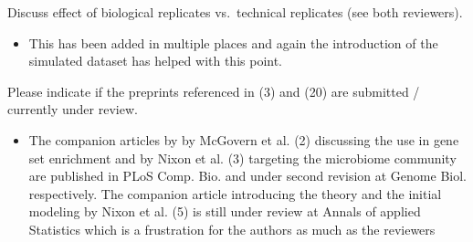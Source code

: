 \documentclass[
]{article}
\providecommand{\tightlist}{%
  \setlength{\itemsep}{0pt}\setlength{\parskip}{0pt}}
\begin{document}
Discuss effect of biological replicates vs.~technical replicates (see
both reviewers).

\begin{itemize}
\tightlist
\item
  This has been added in multiple places and again the introduction of
  the simulated dataset has helped with this point.
\end{itemize}

Please indicate if the preprints referenced in (3) and (20) are
submitted / currently under review.

\begin{itemize}
\tightlist
\item
  The companion articles by by McGovern et al. (2) discussing the use in
  gene set enrichment and by Nixon et al. (3) targeting the microbiome
  community are published in PLoS Comp. Bio. and under second revision
  at Genome Biol. respectively. The companion article introducing the
  theory and the initial modeling by Nixon et al. (5) is still under
  review at Annals of applied Statistics which is a frustration for the
  authors as much as the reviewers
\end{itemize}
\end{document}
